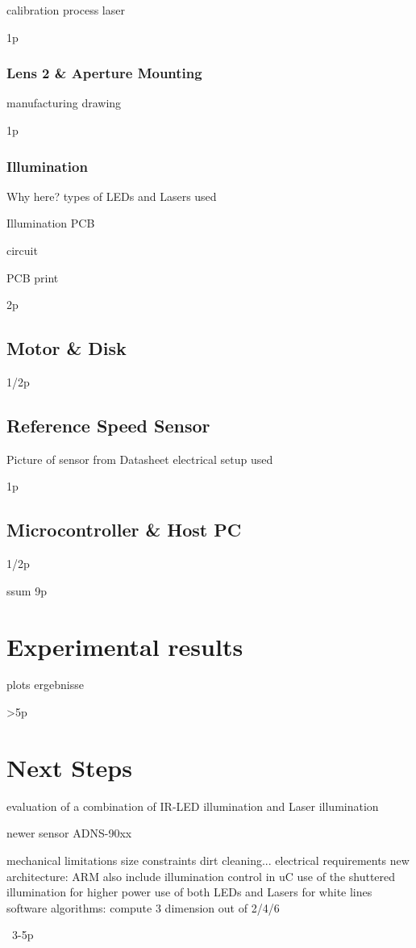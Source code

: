\documentclass[12pt,a4paper]{article}
\begin{document}
calibration process
  laser

1p

\subsubsection{Lens 2 & Aperture Mounting}

manufacturing drawing

1p

\subsubsection{Illumination}

  Why here?
  types of LEDs and Lasers used
 
  Illumination PCB

  circuit

  PCB print

2p

\subsection{Motor & Disk}

1/2p

\subsection{Reference Speed Sensor}
      Picture of sensor from Datasheet
      electrical setup used

1p

\subsection{Microcontroller & Host PC}      

1/2p


ssum 9p

\section{Experimental results}

  plots
  ergebnisse

>5p

\section{Next Steps}

  evaluation of a combination of IR-LED illumination and Laser illumination

  newer sensor ADNS-90xx

  mechanical limitations
    size constraints
    dirt cleaning...
  electrical requirements
    new architecture: ARM
    also include illumination control in uC
      use of the shuttered illumination for higher power 
      use of both LEDs and Lasers for white lines
  software algorithms: compute 3 dimension out of 2/4/6

~3-5p


\label{Bibliography}


%
\end{document}
